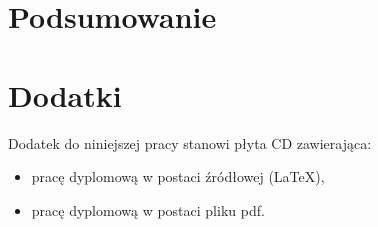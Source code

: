 \documentclass[11pt, a4paper,polish,twoside]{report}
\begin{document}
\chapter{Podsumowanie}
%




\nocite{*}
\printbibliography 


\chapter*{Dodatki}
Dodatek do niniejszej pracy stanowi płyta CD zawierająca:
\begin{itemize}
\item pracę dyplomową w postaci źródłowej (LaTeX),
\item pracę dyplomową w postaci pliku pdf.
\end{itemize}

\newpage
{}	
\listoffigures

\newpage
{}	
\listoftables

\end{document}
